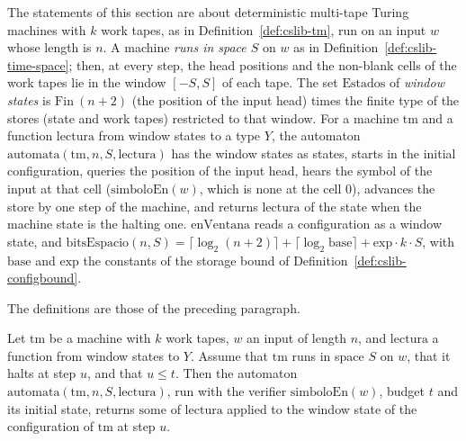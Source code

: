 The statements of this section are about deterministic multi-tape Turing machines with $k$ work
tapes, as in Definition~\ref{def:cslib-tm}, run on an input $w$ whose length is $n$. A machine
\emph{runs in space $S$} on $w$ as in Definition~\ref{def:cslib-time-space}; then, at every step,
the head positions and the non-blank cells of the work tapes lie in the window $[-S, S]$ of each
tape. The set $\mathrm{Estados}$ of \emph{window states} is $\mathrm{Fin}\ (n+2)$ (the position of
the input head) times the finite type of the stores (state and work tapes) restricted to that
window. For a machine $\mathrm{tm}$ and a function $\mathrm{lectura}$ from window states to a type
$Y$, the automaton $\mathrm{automata}(\mathrm{tm}, n, S, \mathrm{lectura})$ has the window states as
states, starts in the initial configuration, queries the position of the input head, hears the
symbol of the input at that cell ($\mathrm{simboloEn}(w)$, which is $\mathrm{none}$ at the cell $0$),
advances the store by one step of the machine, and returns $\mathrm{lectura}$ of the state when the
machine state is the halting one. $\mathrm{enVentana}$ reads a configuration as a window state, and
$\mathrm{bitsEspacio}(n, S) = \lceil \log_2 (n+2) \rceil + \lceil \log_2 \mathrm{base} \rceil +
\mathrm{exp} \cdot k \cdot S$, with $\mathrm{base}$ and $\mathrm{exp}$ the constants of the storage
bound of Definition~\ref{def:cslib-configbound}.

\begin{definition}
  \label{def:dynamics-bridge}
  \leanok
  The definitions are those of the preceding paragraph.
  \own{}
\end{definition}

\begin{theorem}
  \label{thm:dynamics-bridge-run}
  \leanok
  Let $\mathrm{tm}$ be a machine with $k$ work tapes, $w$ an input of length $n$, and
  $\mathrm{lectura}$ a function from window states to $Y$. Assume that $\mathrm{tm}$ runs in space
  $S$ on $w$, that it halts at step $u$, and that $u \le t$. Then the automaton
  $\mathrm{automata}(\mathrm{tm}, n, S, \mathrm{lectura})$, run with the verifier
  $\mathrm{simboloEn}(w)$, budget $t$ and its initial state, returns
  $\mathrm{some}$ of $\mathrm{lectura}$ applied to the window state of the configuration of
  $\mathrm{tm}$ at step $u$.
  \own{}
\end{theorem}

